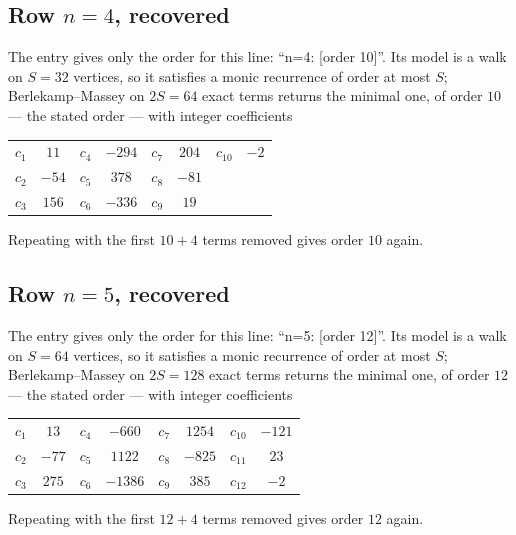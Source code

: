 \documentclass[11pt,a4paper]{article}
\theoremstyle{plain}
\theoremstyle{definition}
\begin{document}
\subsection*{Row $n=4$, recovered}
The entry gives only the order for this line: ``n=4: [order 10]''. Its model is a walk on
$S=32$ vertices, so it satisfies a monic recurrence of order at most $S$;
Berlekamp--Massey on $2S=64$ exact terms returns the minimal one, of order
$10$ --- the stated order --- with integer coefficients
\begin{center}\small\begin{tabular}{cccccccc}
$c_{1}$ & $11$ & $c_{4}$ & $-294$ & $c_{7}$ & $204$ & $c_{10}$ & $-2$ \\
$c_{2}$ & $-54$ & $c_{5}$ & $378$ & $c_{8}$ & $-81$ &  &  \\
$c_{3}$ & $156$ & $c_{6}$ & $-336$ & $c_{9}$ & $19$ &  &  \\
\end{tabular}\end{center}
Repeating with the first $10+4$ terms removed gives order $10$ again.

\subsection*{Row $n=5$, recovered}
The entry gives only the order for this line: ``n=5: [order 12]''. Its model is a walk on
$S=64$ vertices, so it satisfies a monic recurrence of order at most $S$;
Berlekamp--Massey on $2S=128$ exact terms returns the minimal one, of order
$12$ --- the stated order --- with integer coefficients
\begin{center}\small\begin{tabular}{cccccccc}
$c_{1}$ & $13$ & $c_{4}$ & $-660$ & $c_{7}$ & $1254$ & $c_{10}$ & $-121$ \\
$c_{2}$ & $-77$ & $c_{5}$ & $1122$ & $c_{8}$ & $-825$ & $c_{11}$ & $23$ \\
$c_{3}$ & $275$ & $c_{6}$ & $-1386$ & $c_{9}$ & $385$ & $c_{12}$ & $-2$ \\
\end{tabular}\end{center}
Repeating with the first $12+4$ terms removed gives order $12$ again.
\end{document}
